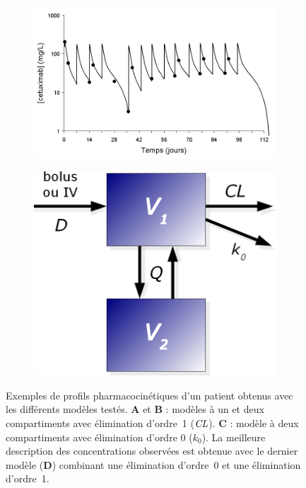 \begin{figure}[htbp]
  
  \begin{subfigure}[b]{0.75\linewidth}
    \centering
    \includegraphics[width=0.75\linewidth]{figures/raster/FIG_19d1} 
  \end{subfigure}%
  \begin{subfigure}[b]{0.25\linewidth}
    \centering
    \includegraphics[width=0.75\linewidth]{figures/raster/FIG_19d2} 
  \end{subfigure} 
  
  \caption[Profils PK d'un patient avec les différents modèles]{Exemples de profils pharmacocinétiques d'un patient obtenus avec les différents modèles testés. \textbf{A} et \textbf{B} : modèles à un et deux compartiments avec élimination d'ordre~1 ($\operatorname{\textit{CL}}$). \textbf{C} : modèle à deux compartiments avec élimination d'ordre 0 ($k_0$). La meilleure description des concentrations observées est obtenue avec le dernier modèle (\textbf{D}) combinant une élimination d'ordre~0 et une élimination d'ordre~1.}
  \label{fig:19} 
\end{figure}

